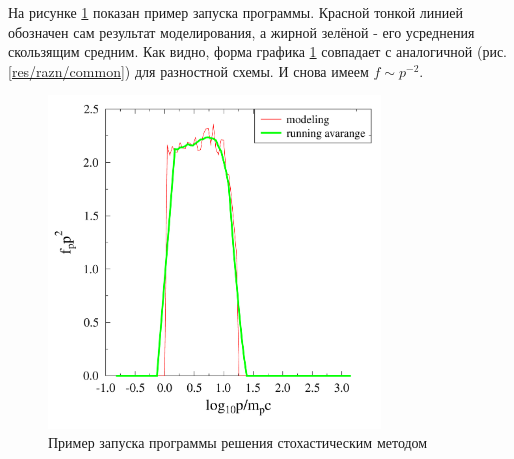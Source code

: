 \documentclass[a4paper,14pt]{extarticle} %
\begin{document}
На рисунке \ref{res/stoh/common} показан пример запуска программы. Красной тонкой линией обозначен сам результат моделирования, а жирной зелёной - его усреднения скользящим средним. Как видно, форма графика \ref{res/stoh/common} совпадает с аналогичной (рис.  \ref{res/razn/common}) для разностной схемы. И снова имеем $f\sim p^{-2}$.

\begin{figure}[H]
\centering
\includegraphics[width=250pt]{stoh_bom_one}
\caption{Пример запуска программы решения стохастическим методом}
\label{res/stoh/common}
\end{figure}
\end{document}
